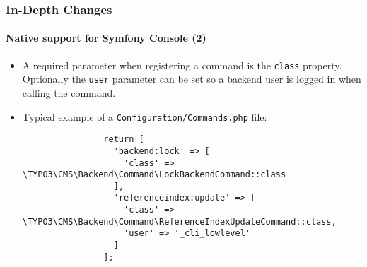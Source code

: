 \begin{frame}[fragile]
	\frametitle{In-Depth Changes}
	\framesubtitle{Native support for Symfony Console (2)}

	\lstset{basicstyle=\tiny\ttfamily}

	\begin{itemize}

		\item A required parameter when registering a command is the \texttt{class} property.
			Optionally the \texttt{user} parameter can be set so a backend user is logged
			in when calling the command.

		\item Typical example of a \texttt{Configuration/Commands.php} file:

			\begin{lstlisting}
				return [
				  'backend:lock' => [
				    'class' => \TYPO3\CMS\Backend\Command\LockBackendCommand::class
				  ],
				  'referenceindex:update' => [
				    'class' => \TYPO3\CMS\Backend\Command\ReferenceIndexUpdateCommand::class,
				    'user' => '_cli_lowlevel'
				  ]
				];
			\end{lstlisting}

	\end{itemize}

\end{frame}

